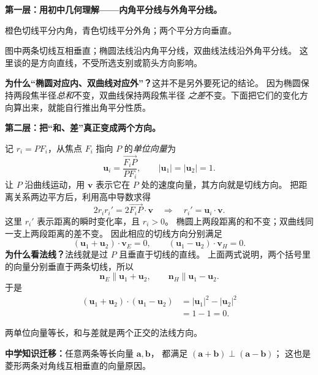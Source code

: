 \clearpage
\begin{explanationbox}
\textbf{第一层：用初中几何理解——内角平分线与外角平分线。}

\begin{center}


{\small 橙色切线平分内角，青色切线平分外角；两个平分方向垂直。}
\end{center}
图中两条切线互相垂直；椭圆法线沿内角平分线，双曲线法线沿外角平分线。
这里谈的是方向直线，不受所选支别或箭头方向影响。

\textbf{为什么“椭圆对应内、双曲线对应外”？}这并不是另外要死记的结论。
因为椭圆保持两段焦半径\emph{总和}不变，双曲线保持两段焦半径
\emph{之差}不变。下面把它们的变化方向算出来，就能自行推出角平分性质。
\end{explanationbox}

\clearpage
\begin{explanationbox}
\textbf{第二层：把“和、差”真正变成两个方向。}

记 $r_i=PF_i$，从焦点 $F_i$ 指向 $P$ 的\emph{单位向量}为
\[
\mathbf u_i=\frac{\overrightarrow{F_iP}}{PF_i},\qquad
|\mathbf u_1|=|\mathbf u_2|=1.
\]
让 $P$ 沿曲线运动，用 $\mathbf v$ 表示它在 $P$ 处的速度向量，其方向就是切线方向。
把距离关系两边平方后，利用高中导数求得
\[
2r_i r_i'=2\overrightarrow{F_iP}\cdot\mathbf v
\quad\Longrightarrow\quad r_i'=\mathbf u_i\cdot\mathbf v.
\]
这里 $r_i'$ 表示距离的瞬时变化率，且 $r_i>0$。
椭圆上两段距离的和不变；双曲线同一支上两段距离的差不变。
因此相应的切线方向分别满足
\[
(\mathbf u_1+\mathbf u_2)\cdot\mathbf v_E=0,\qquad
(\mathbf u_1-\mathbf u_2)\cdot\mathbf v_H=0.
\]
\textbf{为什么看法线？}法线就是过 $P$ 且垂直于切线的直线。
上面两式说明，两个括号里的向量分别垂直于两条切线，所以
\[
\mathbf n_E\parallel\mathbf u_1+\mathbf u_2,\qquad
\mathbf n_H\parallel\mathbf u_1-\mathbf u_2.
\]
于是
\[
\begin{aligned}
(\mathbf u_1+\mathbf u_2)\cdot(\mathbf u_1-\mathbf u_2)
&=|\mathbf u_1|^2-|\mathbf u_2|^2\\
&=1-1=0.
\end{aligned}
\]
\begin{center}


{\small 两单位向量等长，和与差就是两个正交的法线方向。}
\end{center}
\textbf{中学知识迁移：}任意两条等长向量 $\mathbf a,\mathbf b$，
都满足 $(\mathbf a+\mathbf b)\perp(\mathbf a-\mathbf b)$；
这也是菱形两条对角线互相垂直的向量原因。
\end{explanationbox}


